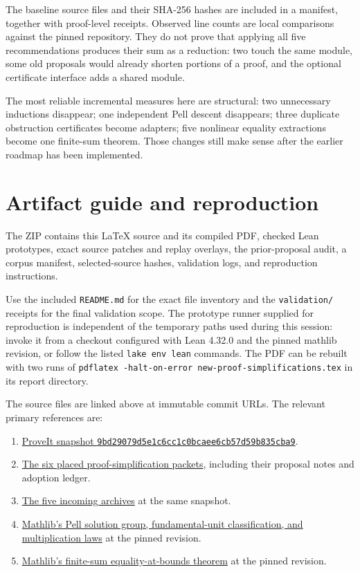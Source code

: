 \documentclass[11pt,letterpaper]{article}
\newcommand{\code}[1]{\nolinkurl{#1}}
\newcommand{\mathsrc}[2]{\href{https://github.com/leanprover-community/mathlib4/blob/81a5d257c8e410db227a6665ed08f64fea08e997/Mathlib/#1.lean}{#2}}
\begin{document}
The baseline source files and their SHA-256 hashes are included in a manifest, together with proof-level receipts. Observed line counts are local comparisons against the pinned repository. They do not prove that applying all five recommendations produces their sum as a reduction: two touch the same module, some old proposals would already shorten portions of a proof, and the optional certificate interface adds a shared module.

The most reliable incremental measures here are structural: two unnecessary inductions disappear; one independent Pell descent disappears; three duplicate obstruction certificates become adapters; five nonlinear equality extractions become one finite-sum theorem. Those changes still make sense after the earlier roadmap has been implemented.

\section{Artifact guide and reproduction}

The ZIP contains this LaTeX source and its compiled PDF, checked Lean prototypes, exact source patches and replay overlays, the prior-proposal audit, a corpus manifest, selected-source hashes, validation logs, and reproduction instructions.

Use the included \code{README.md} for the exact file inventory and the \code{validation/} receipts for the final validation scope. The prototype runner supplied for reproduction is independent of the temporary paths used during this session: invoke it from a checkout configured with Lean 4.32.0 and the pinned mathlib revision, or follow the listed \code{lake env lean} commands. The PDF can be rebuilt with two runs of \code{pdflatex -halt-on-error new-proof-simplifications.tex} in its report directory.

The source files are linked above at immutable commit URLs. The relevant primary references are:
\begin{enumerate}
\item \href{https://github.com/VladimirReshetnikov/ProveIt/commit/9bd29079d5e1c6cc1c0bcaee6cb57d59b835cba9}{ProveIt snapshot \texttt{9bd29079d5e1c6cc1c0bcaee6cb57d59b835cba9}}.
\item \href{https://github.com/VladimirReshetnikov/ProveIt/tree/9bd29079d5e1c6cc1c0bcaee6cb57d59b835cba9/Computability/DiophantineConsistency/research/lean-proof-simplification}{The six placed proof-simplification packets}, including their proposal notes and adoption ledger.
\item \href{https://github.com/VladimirReshetnikov/ProveIt/tree/9bd29079d5e1c6cc1c0bcaee6cb57d59b835cba9/docs/incoming}{The five incoming archives} at the same snapshot.
\item \mathsrc{NumberTheory/Pell}{Mathlib's Pell solution group, fundamental-unit classification, and multiplication laws} at the pinned revision.
\item \mathsrc{Algebra/Order/BigOperators/Group/Finset}{Mathlib's finite-sum equality-at-bounds theorem} at the pinned revision.
\end{enumerate}
\end{document}
